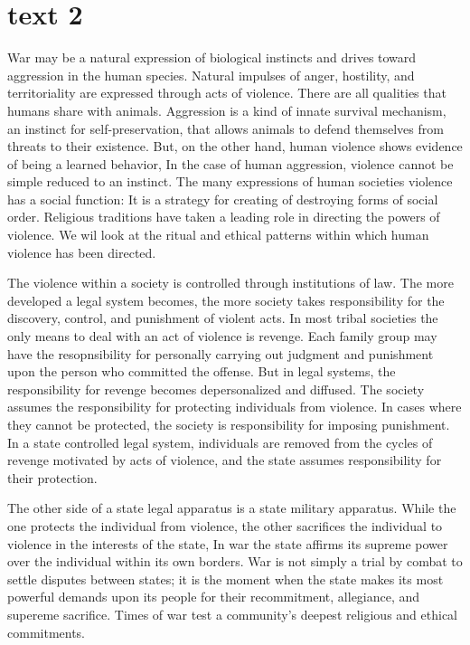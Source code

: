 \documentclass[UTF8]{ctexart}
\begin{document}
\section{text 2}

War may be a natural expression of biological instincts and drives toward aggression in the human species. Natural impulses
of anger, hostility, and territoriality are expressed through acts of violence. There are all qualities that humans share
with animals. Aggression is a kind of innate survival mechanism, an instinct for self-preservation, that allows animals to defend themselves from threats to their existence.
But, on the other hand, human violence shows evidence of being a learned behavior, In the case of human aggression, violence cannot be simple reduced to an instinct. The
many expressions of human societies violence has a social function: It is a strategy for creating of destroying forms of social order. Religious traditions have taken a
leading role in directing the powers of violence. We wil look at the ritual and ethical patterns within which human violence has been directed.

The violence within a society is controlled through institutions of law. The more developed a legal system becomes, the more society takes responsibility for the discovery, control, and punishment of violent acts. In most tribal societies the only means to deal with an act of violence is revenge. Each family group may have the resopnsibility
for personally carrying out judgment and punishment upon the person who committed the offense. But in legal systems, the responsibility for revenge becomes depersonalized
and diffused. The society assumes the responsibility for protecting individuals from violence. In cases where they cannot be protected, the society is responsibility
for imposing punishment. In a state controlled legal system, individuals are removed from the cycles of revenge motivated by acts of violence, and the state assumes
responsibility for their protection.

The other side of a state legal apparatus is a state military apparatus. While the one protects the individual from violence, the other sacrifices the individual to violence 
in the interests of the state, In war the state affirms its supreme power over the individual within its own borders. War is not simply a trial by combat to settle disputes
between states; it is the moment when the state makes its most powerful demands upon its people for their recommitment, allegiance, and supereme sacrifice. Times of war
test a community's deepest religious and ethical commitments.
 
\end{document}
